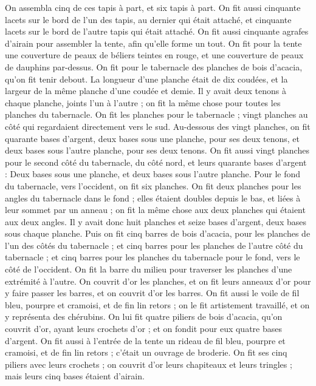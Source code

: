\begin{multicols}{2}
On assembla cinq de ces tapis à part, et six tapis à part.
On fit aussi cinquante lacets sur le bord de l'un des tapis, au dernier qui était attaché, et cinquante lacets sur le bord de l'autre tapis qui était attaché.
On fit aussi cinquante agrafes d'airain pour assembler la tente, afin qu’elle forme un tout.
On fit pour la tente une couverture de peaux de béliers teintes en rouge, et une couverture de peaux de dauphins par-dessus.
On fit pour le tabernacle des planches de bois d’acacia, qu'on fit tenir debout.
La longueur d’une planche était de dix coudées, et la largeur de la même planche d'une coudée et demie.
Il y avait deux tenons à chaque planche, joints l'un à l'autre ; on fit la même chose pour toutes les planches du tabernacle.
On fit les planches pour le tabernacle ; vingt planches au côté qui regardaient directement vers le sud.
Au-dessous des vingt planches, on fit quarante bases d'argent, deux bases sous une planche, pour ses deux tenons, et deux bases sous l'autre planche, pour ses deux tenons.
On fit aussi vingt planches pour le second côté du tabernacle, du côté nord,
et leurs quarante bases d'argent : Deux bases sous une planche, et deux bases sous l'autre planche.
Pour le fond du tabernacle, vers l'occident, on fit six planches.
On fit deux planches pour les angles du tabernacle dans le fond ;
elles étaient doubles depuis le bas, et liées à leur sommet par un anneau ; on fit la même chose aux deux planches qui étaient aux deux angles.
Il y avait donc huit planches et seize bases d'argent, deux bases sous chaque planche.
Puis on fit cinq barres de bois d’acacia, pour les planches de l'un des côtés du tabernacle ;
et cinq barres pour les planches de l'autre côté du tabernacle ; et cinq barres pour les planches du tabernacle pour le fond, vers le côté de l'occident.
On fit la barre du milieu pour traverser les planches d’une extrémité à l’autre.
On couvrit d'or les planches, et on fit leurs anneaux d'or pour y faire passer les barres, et on couvrit d'or les barres.
On fit aussi le voile de fil bleu, pourpre et cramoisi, et de fin lin retors ; on le fit artistement travaillé, et on y représenta des chérubins.
On lui fit quatre piliers de bois d’acacia, qu'on couvrit d'or, ayant leurs crochets d'or ; et on fondit pour eux quatre bases d'argent.
On fit aussi à l'entrée de la tente un rideau de fil bleu, pourpre et cramoisi, et de fin lin retors ; c’était un ouvrage de broderie.
On fit ses cinq piliers avec leurs crochets ; on couvrit d'or leurs chapiteaux et leurs tringles ; mais leurs cinq bases étaient d'airain.

\end{multicols}
